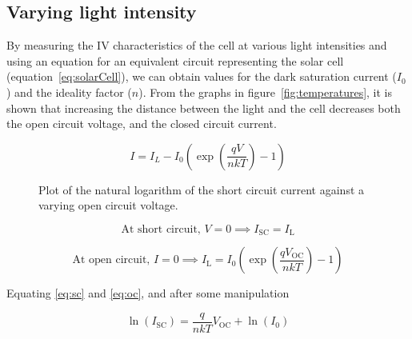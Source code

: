 \documentclass[a4paper,11pt]{article}
\begin{document}
\subsection{Varying light intensity}
By measuring the IV characteristics of the cell at various light intensities and using an equation for an equivalent circuit representing the solar cell (equation~\ref{eq:solarCell}), we can obtain values for the dark saturation current ($I_0$) and the ideality factor ($n$). From the graphs in figure~\ref{fig:temperatures}, it is shown that increasing the distance between the light and the cell decreases both the open circuit voltage, and the closed circuit current.

\begin{equation} \label{eq:solarCell}
I = I_L - I_0 \left( \exp{\left(\frac{qV}{nkT}\right)} - 1 \right)
\end{equation}

\begin{figure}[h]
\centering
{}
\caption{Plot of the natural logarithm of the short circuit current against a varying open circuit voltage.}
\label{plot:2b}
\end{figure}

\begin{equation} \label{eq:sc}
\textrm{At short circuit, }
V = 0 \implies I_{\mathrm{SC}} = I_{\mathrm{L}}
\end{equation}

\begin{equation} \label{eq:oc}
\textrm{At open circuit, }
I = 0 \implies I_{\mathrm{L}} = I_0 \left(\exp{\left(\frac{qV_{\mathrm{OC}}}{nkT}\right)} - 1 \right)
\end{equation}

Equating \ref{eq:sc} and \ref{eq:oc}, and after some manipulation

\begin{equation} \label{eq:intensityGradient}
\ln{\left(I_{\mathrm{SC}}\right)} = \frac{q}{nkT} V_{\mathrm{OC}} + \ln{(I_0)}
\end{equation}
\end{document}
